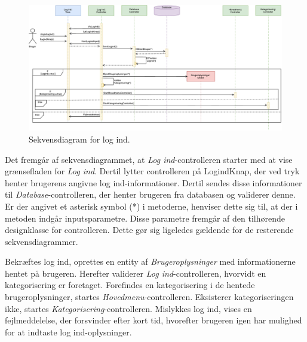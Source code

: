 \begin{figure} [H]
\centering
\includegraphics[width=1.55\textwidth, angle=90]{figures/Sek/SEKLogInd}
\caption{Sekvensdiagram for log ind.}
\label{fig:SEKlogind}
\end{figure}

\noindent
Det fremgår af sekvensdiagrammet, at \textit{Log ind}-controlleren starter med at vise grænsefladen for \textit{Log ind}. Dertil lytter controlleren på LogindKnap, der ved tryk henter brugerens angivne log ind-informationer. Dertil sendes disse informationer til \textit{Database}-controlleren, der henter brugeren fra databasen og validerer denne. Er der angivet et asterisk symbol (*) i metoderne, henviser dette sig til, at der i metoden indgår inputsparametre. Disse parametre fremgår af den tilhørende designklasse for controlleren. Dette gør sig ligeledes gældende for de resterende sekvensdiagrammer. 

Bekræftes log ind, oprettes en entity af \textit{Brugeroplysninger} med informationerne hentet på brugeren. Herefter validerer \textit{Log ind}-controlleren, hvorvidt en kategorisering er foretaget. Forefindes en kategorisering i de hentede brugeroplysninger, startes \textit{Hovedmenu}-controlleren. Eksisterer kategoriseringen ikke, startes \textit{Kategorisering}-controlleren. Mislykkes log ind, vises en fejlmeddelelse, der forsvinder efter kort tid, hvorefter brugeren igen har mulighed for at indtaste log ind-oplysninger. 
